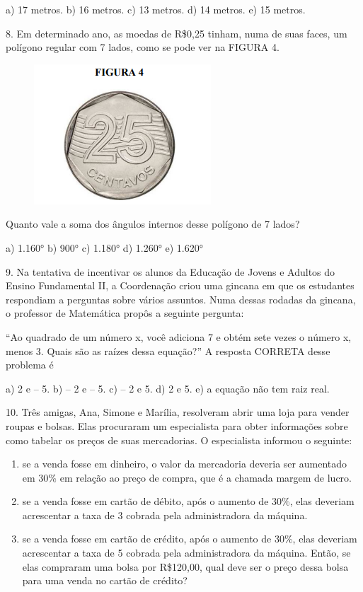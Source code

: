 \documentclass[12pt,a4paper]{article}
\begin{document}
\vspace{2ex}
a) 17 metros.
b) 16 metros.
c) 13 metros.
d) 14 metros.
e) 15 metros. 
\vspace{2ex}

8. Em determinado ano, as moedas de R\$0,25 tinham, numa de suas faces, um polígono regular com 7 lados,
como se pode ver na FIGURA 4.

\begin{figure}[ht]
\centering
\includegraphics[width=0.3 \linewidth]{./figuras/Fig4.png}
\end{figure}

Quanto vale a soma dos ângulos internos desse polígono de 7 lados?

\vspace{2ex}
a) 1.160°
b) 900°
c) 1.180°
d) 1.260°
e) 1.620°
\vspace{2ex}



9. Na tentativa de incentivar os alunos da Educação de Jovens e Adultos do Ensino Fundamental II, a
Coordenação criou uma gincana em que os estudantes respondiam a perguntas sobre vários assuntos.
Numa dessas rodadas da gincana, o professor de Matemática propôs a seguinte pergunta:

\vspace{2ex}
“Ao quadrado de um número x, você adiciona 7 e obtém sete vezes o
número x, menos 3. Quais são as raízes dessa equação?”
A resposta CORRETA desse problema é

\vspace{2ex}
a) 2 e – 5.
b) – 2 e – 5.
c) – 2 e 5.
d) 2 e 5.
e) a equação não tem raiz real.
\vspace{2ex}

10. Três amigas, Ana, Simone e Marília, resolveram abrir uma loja para vender roupas e bolsas. Elas
procuraram um especialista para obter informações sobre como tabelar os preços de suas mercadorias. O
especialista informou o seguinte:

\vspace{2ex}
\begin{enumerate}
\item se a venda fosse em dinheiro, o valor da mercadoria deveria ser aumentado em 30\% em relação ao
preço de compra, que é a chamada margem de lucro.
\item se a venda fosse em cartão de débito, após o aumento de 30\%, elas deveriam acrescentar a taxa de 3%
cobrada pela administradora da máquina.
\item se a venda fosse em cartão de crédito, após o aumento de 30\%, elas deveriam acrescentar a taxa de 5%
cobrada pela administradora da máquina.
Então, se elas compraram uma bolsa por R\$120,00, qual deve ser o preço dessa bolsa para uma venda no
cartão de crédito?
\end{enumerate}
\vspace{2ex}
\end{document}
